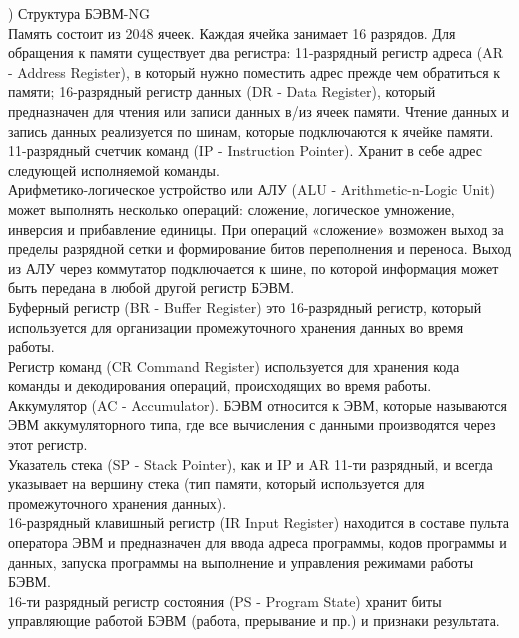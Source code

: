 ) Структура БЭВМ-NG \\
Память состоит из 2048 ячеек. Каждая ячейка занимает 16 разрядов. Для обращения к памяти существует два регистра: 11-разрядный регистр адреса (AR - Address Register), в который нужно поместить адрес прежде чем обратиться к памяти; 16-разрядный регистр данных (DR - Data Register), который предназначен для чтения или записи данных в/из ячеек памяти. Чтение данных и запись данных реализуется по шинам, которые подключаются к ячейке памяти. \\
11-разрядный счетчик команд (IP - Instruction Pointer). Хранит в себе адрес следующей исполняемой команды. \\
Арифметико-логическое устройство или АЛУ (ALU - Arithmetic-n-Logic Unit) может выполнять несколько операций: сложение, логическое умножение, инверсия и прибавление единицы. При операций «сложение» возможен выход за пределы разрядной сетки и формирование битов переполнения и переноса. Выход из АЛУ через коммутатор подключается к шине, по которой информация может быть передана в любой другой регистр БЭВМ. \\
Буферный регистр (BR - Buffer Register) это 16-разрядный регистр, который используется для организации промежуточного хранения данных во время работы. \\
Регистр команд (CR Command Register) используется для хранения кода команды и декодирования операций, происходящих во время работы. \\
Аккумулятор (AC - Accumulator). БЭВМ относится к ЭВМ, которые называются ЭВМ аккумуляторного типа, где все вычисления с данными производятся через этот регистр. \\
Указатель стека (SP - Stack Pointer), как и IP и AR 11-ти разрядный, и всегда указывает на вершину стека (тип памяти, который используется для промежуточного хранения данных). \\
16-разрядный клавишный регистр (IR Input Register) находится в составе пульта оператора ЭВМ и предназначен для ввода адреса программы, кодов программы и данных, запуска программы на выполнение и управления режимами работы БЭВМ. \\
16-ти разрядный регистр состояния (PS - Program State) хранит биты управляющие работой БЭВМ (работа, прерывание и пр.) и признаки результата. \\

